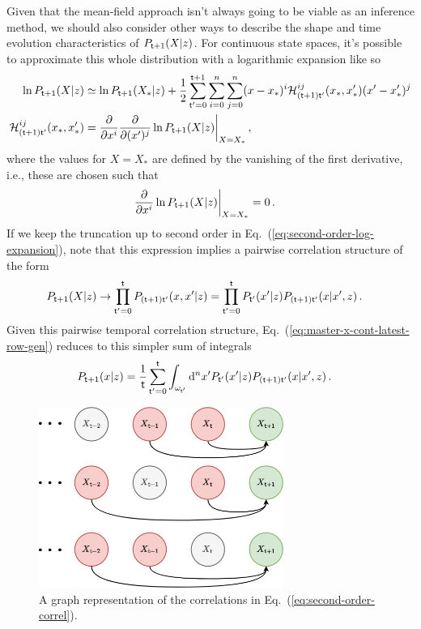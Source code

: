 Given that the mean-field approach isn't always going to be viable as an inference method, we should also consider other ways to describe the shape and time evolution characteristics of $P_{{\sf t}+1}(X\vert z)$. For continuous state spaces, it's possible to approximate this whole distribution with a logarithmic expansion like so
\begin{align}
\ln P_{{\sf t}+1}(X\vert z) &\simeq \ln P_{{\sf t}+1}(X_*\vert z) + \frac{1}{2}\sum_{{\sf t}'=0}^{{\sf t}+1}\sum_{i=0}^{n}\sum_{j=0}^{n} (x-x_*)^i {\cal H}^{ij}_{({\sf t}+1){\sf t}'}(x_*,x'_*) (x'-x'_*)^j \label{eq:second-order-log-expansion} \\
{\cal H}^{ij}_{({\sf t}+1){\sf t}'}(x_*,x'_*) &= \frac{\partial}{\partial x^i}\frac{\partial}{\partial (x')^j}\ln P_{{\sf t}+1}(X\vert z) \bigg\vert_{X=X_*} \,,
\end{align}
where the values for $X=X_*$ are defined by the vanishing of the first derivative, i.e., these are chosen such that
\begin{align}
\frac{\partial}{\partial x^i}\ln P_{{\sf t}+1}(X\vert z) \bigg\vert_{X=X_*} &= 0 \,.
\end{align}
If we keep the truncation up to second order in Eq.~(\ref{eq:second-order-log-expansion}), note that this expression implies a pairwise correlation structure of the form
\begin{align}
P_{{\sf t}+1}(X\vert z) &\rightarrow \prod_{{\sf t}'=0}^{{\sf t}}P_{({\sf t}+1){\sf t}'}(x,x'\vert z) = \prod_{{\sf t}'=0}^{{\sf t}}P_{{\sf t}'}(x'\vert z)P_{({\sf t}+1){\sf t}'}(x\vert x', z) \,.
\end{align}
Given this pairwise temporal correlation structure, Eq.~(\ref{eq:master-x-cont-latest-row-gen}) reduces to this simpler sum of integrals
\begin{align}
P_{{\sf t}+1}(x\vert z) &= \frac{1}{{\sf t}}\sum_{{\sf t}'=0}^{{\sf t}}\int_{\omega_{{\sf t}'}}{\rm d}^nx' P_{{\sf t}'}(x'\vert z)P_{({\sf t}+1){\sf t}'}(x\vert x',z) \label{eq:second-order-correl} \,.
\end{align}

\begin{figure}[h]
\centering
\includegraphics[width=8cm]{images/chapter-2-second-temporal-correlation.drawio.png}
\caption{A graph representation of the correlations in Eq.~(\ref{eq:second-order-correl}).}
\label{fig:second-temporal-correlation}
\end{figure} 

